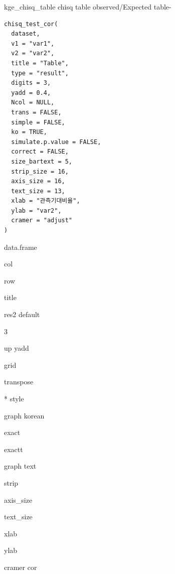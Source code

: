\documentclass[a4paper]{book}
\begin{document}
%
\begin{Description}
kge\_chisq\_table chisq table observed/Expected table-
\end{Description}
%
\begin{Usage}
\begin{verbatim}
chisq_test_cor(
  dataset,
  v1 = "var1",
  v2 = "var2",
  title = "Table",
  type = "result",
  digits = 3,
  yadd = 0.4,
  Ncol = NULL,
  trans = FALSE,
  simple = FALSE,
  ko = TRUE,
  simulate.p.value = FALSE,
  correct = FALSE,
  size_bartext = 5,
  strip_size = 16,
  axis_size = 16,
  text_size = 13,
  xlab = "관측기대비율",
  ylab = "var2",
  cramer = "adjust"
)
\end{verbatim}
\end{Usage}
%
\begin{Arguments}
\begin{ldescription}
\item[\code{dataset}] data.frame

\item[\code{v1}] col

\item[\code{v2}] row

\item[\code{title}] title

\item[\code{type}] res2 default

\item[\code{digits}] 3

\item[\code{yadd}] up yadd

\item[\code{Ncol}] grid

\item[\code{trans}] transpose

\item[\code{simple}] * style

\item[\code{ko}] graph korean

\item[\code{simulate.p.value}] exact

\item[\code{correct}] exactt

\item[\code{size\_bartext}] graph text

\item[\code{strip\_size}] strip

\item[\code{axis\_size}] axis\_size

\item[\code{text\_size}] text\_size

\item[\code{xlab}] xlab

\item[\code{ylab}] ylab

\item[\code{cramer}] cramer cor
\end{ldescription}
\end{Arguments}
\end{document}
